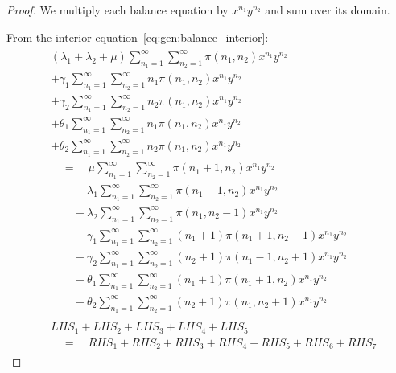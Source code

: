 \begin{proof}

    We multiply each balance equation by $x^{n_1}y^{n_2}$ and sum over its domain.

    From the interior equation~\eqref{eq:gen:balance_interior}:
    \begin{align}
        \begin{split}
            & (\lambda_1 + \lambda_2 + \mu) \sum_{n_1=1}^{\infty} \sum_{n_2=1}^{\infty} \pi(n_1,n_2) x^{n_1}y^{n_2} \\
            &+ \gamma_1 \sum_{n_1=1}^{\infty} \sum_{n_2=1}^{\infty} n_1 \pi(n_1,n_2) x^{n_1}y^{n_2} \\
            &+ \gamma_2 \sum_{n_1=1}^{\infty} \sum_{n_2=1}^{\infty} n_2 \pi(n_1,n_2) x^{n_1}y^{n_2} \\
            &+ \theta_1 \sum_{n_1=1}^{\infty} \sum_{n_2=1}^{\infty} n_1 \pi(n_1,n_2) x^{n_1}y^{n_2} \\
            &+ \theta_2 \sum_{n_1=1}^{\infty} \sum_{n_2=1}^{\infty} n_2 \pi(n_1,n_2) x^{n_1}y^{n_2} \\
            &\quad = \quad \mu \sum_{n_1=1}^{\infty} \sum_{n_2=1}^{\infty} \pi(n_1+1,n_2)x^{n_1}y^{n_2} \\
            &\quad\quad  + \lambda_1 \sum_{n_1=1}^{\infty} \sum_{n_2=1}^{\infty} \pi(n_1-1,n_2)x^{n_1}y^{n_2} \\
            &\quad\quad + \lambda_2 \sum_{n_1=1}^{\infty} \sum_{n_2=1}^{\infty} \pi(n_1,n_2-1)x^{n_1}y^{n_2} \\
            &\quad\quad + \gamma_1 \sum_{n_1=1}^{\infty} \sum_{n_2=1}^{\infty} (n_1+1)\pi(n_1+1,n_2-1)x^{n_1}y^{n_2} \\
            &\quad\quad + \gamma_2 \sum_{n_1=1}^{\infty} \sum_{n_2=1}^{\infty} (n_2+1)\pi(n_1-1,n_2+1)x^{n_1}y^{n_2} \\
            &\quad\quad + \theta_1 \sum_{n_1=1}^{\infty} \sum_{n_2=1}^{\infty} (n_1+1)\pi(n_1+1,n_2)x^{n_1}y^{n_2} \\
            &\quad\quad + \theta_2 \sum_{n_1=1}^{\infty} \sum_{n_2=1}^{\infty} (n_2+1)\pi(n_1,n_2+1)x^{n_1}y^{n_2}
        \end{split} \\
        \begin{split}
            & LHS_1 + LHS_2 + LHS_3 + LHS_4 + LHS_5 \\
            & \quad = \quad RHS_1 + RHS_2 + RHS_3 + RHS_4 + RHS_5 + RHS_6 + RHS_7
        \end{split}
    \end{align}
    

\end{proof}
